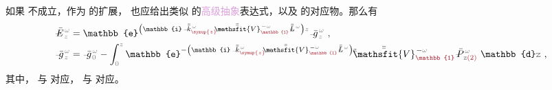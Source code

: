 如果  不成立，作为  的扩展，  也应给出类似  的\textcolor{Plum}{高级抽象}表达式，以及  的对应物。那么有
\begin{subequations} \label{eq:simplify6-SVA-E'-V_1nonsingular-Abstract_Exp}
\begin{align}
	\xint{\mathcolor{gray}{-}}{295}{\bar{E}}^{\;\!\mathcolor{gray}{\omega}}_{\;\! \mathcolor{gray}{z}}
	&= \mathbb{e}^{\left( \mathbb{i} \xint{\begin{smallmatrix} ~ \\ {}^{}_{\mathcolor{gray}{-}} \\ ~ \end{smallmatrix}}{15}{\bar{\bar{k}}}_{\textcolor{Maroon}{\symup{z}}}^{\;\! \mathcolor{gray}{\omega}} - \xint{\mathcolor{gray}{-}}{25}{\bar{\bar{\mathsfit{V}}}}^{\;\! - \mathcolor{gray}{\omega}}_{\textcolor{Maroon}{\mathbb{1}}} \xint{\mathcolor{gray}{-}}{32}{\bar{\bar{L}}}^{\;\! \mathcolor{gray}{\omega}} \right) \mathcolor{gray}{z}} \xint{{}^{}_{\mathcolor{gray}{-}}}{10}{\bar{g}}^{\;\!\mathcolor{gray}{\omega}}_{\;\! \mathcolor{gray}{z}} ~, \label{eq:simplify6-SVA-E'-V_1nonsingular-abstract_exp} \\
	\xint{{}^{}_{\mathcolor{gray}{-}}}{10}{\bar{g}}^{\;\!\mathcolor{gray}{\omega}}_{\;\! \mathcolor{gray}{z}}
	&= \xint{{}^{}_{\mathcolor{gray}{-}}}{10}{\bar{g}}^{\;\!\mathcolor{gray}{\omega}}_{\;\! \mathcolor{gray}{0}} - \int_{\mathcolor{gray}{0}}^{\mathcolor{gray}{z}} \mathbb{e}^{- \left( \mathbb{i} \xint{\begin{smallmatrix} ~ \\ {}^{}_{\mathcolor{gray}{-}} \\ ~ \end{smallmatrix}}{15}{\bar{\bar{k}}}_{\textcolor{Maroon}{\symup{z}}}^{\;\! \mathcolor{gray}{\omega}} - \xint{\mathcolor{gray}{-}}{25}{\bar{\bar{\mathsfit{V}}}}^{\;\! - \mathcolor{gray}{\omega}}_{\textcolor{Maroon}{\mathbb{1}}} \xint{\mathcolor{gray}{-}}{32}{\bar{\bar{L}}}^{\;\! \mathcolor{gray}{\omega}} \right) \mathcolor{gray}{\mathtt{z}}} \cdot \xint{\mathcolor{gray}{-}}{25}{\bar{\bar{\mathsfit{V}}}}^{\;\! - \mathcolor{gray}{\omega}}_{\textcolor{Maroon}{\mathbb{1}}} \xint{\mathcolor{gray}{-}}{30}{\bar{P}}^{\;\! \mathcolor{gray}{\omega}}_{\;\! \mathcolor{gray}{\mathtt{z}} \textcolor{Maroon}{(2)}} ~\mathbb{d} \mathcolor{gray}{\mathtt{z}} ~, \label{eq:simplify6-SVA-E'-V_1nonsingular-abstract_exp-gz}
\end{align}
\end{subequations}
其中， 与  对应， 与  对应。

